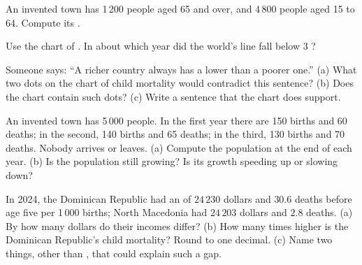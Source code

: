 \begin{exercise}[$\star\star$]\label{exo:g6:health-and-population:6}
An invented town has 1\,200 people aged 65 and over, and 4\,800 people aged 15 to
64. Compute its .
\end{exercise}

\begin{exercise}[$\star\star$]\label{exo:g6:health-and-population:7}
Use the chart of . In about which year did the world's line fall
below 3 ?
\end{exercise}

\begin{exercise}[$\star\star$]\label{exo:g6:health-and-population:8}
Someone says: ``A richer country always has a lower  than a
poorer one.'' (a) What two dots on the chart of child mortality would contradict
this sentence? (b) Does the chart contain such dots? (c) Write a sentence that
the chart does support.
\end{exercise}

\begin{exercise}[$\star\star$]\label{exo:g6:health-and-population:9}
An invented town has 5\,000 people. In the first year there are 150 births and 60
deaths; in the second, 140 births and 65 deaths; in the third, 130 births and 70
deaths. Nobody arrives or leaves. (a) Compute the population at the end of each
year. (b) Is the population still growing? Is its growth speeding up or slowing
down?
\end{exercise}

\begin{exercise}[$\star\star\star$]\label{exo:g6:health-and-population:10}
In 2024, the Dominican Republic had an  of $24\,230$ dollars and
$30.6$ deaths before age five per 1\,000 births; North Macedonia had $24\,203$
dollars and $2.8$ deaths. (a) By how many dollars do their incomes differ?
(b) How many times higher is the Dominican Republic's child mortality? Round to
one decimal. (c) Name two things, other than , that could
explain such a gap.
\end{exercise}

